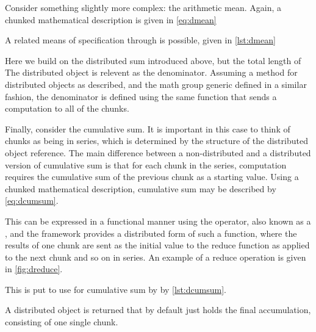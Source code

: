 Consider something slightly more complex: the arithmetic mean.
Again, a chunked mathematical description is given in \cref{eq:dmean}


A related means of specification through \lso{} is possible, given in \cref{lst:dmean}


Here we build on the distributed sum introduced above, but the total length of The distributed object is relevent as the denominator.
Assuming a  method for distributed objects as described, and the math group generic defined in a similar fashion, the denominator is defined using the same  function that sends a  computation to all of the chunks.

Finally, consider the cumulative sum.
It is important in this case to think of chunks as being in series, which is determined by the structure of the distributed object reference.
The main difference between a non-distributed and a distributed version of cumulative sum is that for each chunk in the series, computation requires the cumulative sum of the previous chunk as a starting value.
Using a chunked mathematical description, cumulative sum may be described by \cref{eq:dcumsum}.


This can be expressed in a functional manner using the  operator, also known as a , and the \lso{} framework provides a distributed form of such a function, where the results of one chunk are sent as the initial value to the reduce function as applied to the next chunk and so on in series.
An example of a reduce operation is given in \cref{fig:dreduce}.


This is put to use for cumulative sum by \lso{} by \cref{lst:dcumsum}.


A distributed object is returned that by default just holds the final accumulation, consisting of one single chunk.
